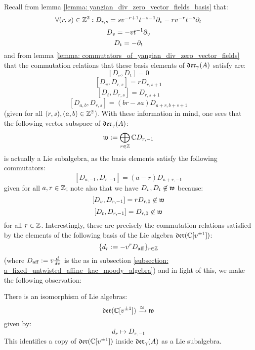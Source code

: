         Recall from lemma \ref{lemma: yangian_div_zero_vector_fields_basis} that:
            $$\forall (r, s) \in \mathbb{Z}^2: D_{r, s} = s v^{-r + 1} t^{-s - 1} \partial_v - r v^{-r} t^{-s} \partial_t$$
            $$D_v = -v t^{-1} \partial_v$$
            $$D_t = -\partial_t$$
        and from lemma \ref{lemma: commutators_of_yangian_div_zero_vector_fields} that the commutation relations that these basis elements of $\mathfrak{der}_{\gamma}(A)$ satisfy are:
            $$[D_v, D_t] = 0$$
            $$[D_v, D_{r, s}] = r D_{r, s + 1}$$
            $$[D_t, D_{r, s}] = D_{r, s + 1}$$
            $$[D_{a, b}, D_{r, s}] = (br - sa) D_{a + r, b + s + 1}$$
        (given for all $(r, s), (a, b) \in \mathbb{Z}^2$). With these information in mind, one sees that the following vector subspace of $\mathfrak{der}_{\gamma}(A)$:
            $$\mathfrak{w} := \bigoplus_{r \in \mathbb{Z}} \mathbb{C} D_{r, -1}$$
        is actually a Lie subalgebra, as the basis elements satisfy the following commutators:
            $$[D_{a, -1}, D_{r, -1}] = (a - r) D_{a + r, -1}$$
        given for all $a, r \in \mathbb{Z}$; note also that we have $D_v, D_t \not \in \mathfrak{w}$ because:
            $$[D_v, D_{r, -1}] = r D_{r, 0} \not \in \mathfrak{w}$$
            $$[D_t, D_{r, -1}] = D_{r, 0} \not \in \mathfrak{w}$$    
        for all $r \in \mathbb{Z}$. Interestingly, these are precisely the commutation relations satisfied by the elements of the following basis of the Lie algebra $\mathfrak{der}(\mathbb{C}[v^{\pm 1}])$:
            $$\{ d_r := -v^r D_{\mathrm{aff}} \}_{r \in \mathbb{Z}}$$
        (where $D_{\mathrm{aff}} := v \frac{d}{dv}$ is the  as in subsection \ref{subsection: a_fixed_untwisted_affine_kac_moody_algebra}) and in light of this, we make the following observation:
        \begin{lemma} \label{lemma: a_copy_of_the_witt_algebra_inside_the_lie_algebra_of_yangian_div_zero_vector_fields}
            There is an isomorphism of Lie algebras:
                $$\mathfrak{der}(\mathbb{C}[v^{\pm 1}]) \xrightarrow[]{\simeq} \mathfrak{w}$$
            given by:
                $$d_r \mapsto D_{r, -1}$$
            This identifies a copy of $\mathfrak{der}(\mathbb{C}[v^{\pm 1}])$ inside $\mathfrak{der}_{\gamma}(A)$ as a Lie subalgebra. 
        \end{lemma}

